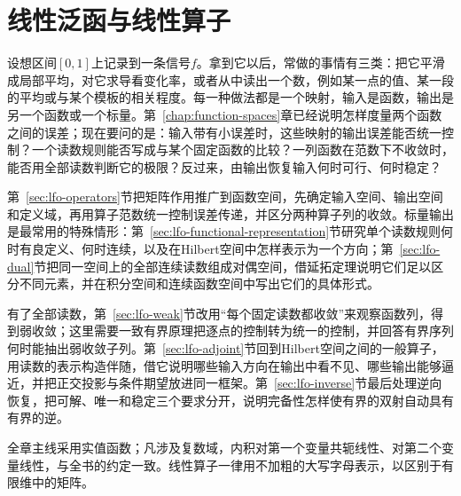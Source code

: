 \chapter{线性泛函与线性算子}
\label{chap:linear-functionals-operators}

设想区间$[0,1]$上记录到一条信号$f$。拿到它以后，常做的事情有三类：把它平滑成局部平均，对它求导看变化率，或者从中读出一个数，例如某一点的值、某一段的平均或与某个模板的相关程度。每一种做法都是一个映射，输入是函数，输出是另一个函数或一个标量。第~\ref{chap:function-spaces}章已经说明怎样度量两个函数之间的误差；现在要问的是：输入带有小误差时，这些映射的输出误差能否统一控制？一个读数规则能否写成与某个固定函数的比较？一列函数在范数下不收敛时，能否用全部读数判断它的极限？反过来，由输出恢复输入何时可行、何时稳定？

第~\ref{sec:lfo-operators}节把矩阵作用推广到函数空间，先确定输入空间、输出空间和定义域，再用算子范数统一控制误差传递，并区分两种算子列的收敛。标量输出是最常用的特殊情形：第~\ref{sec:lfo-functional-representation}节研究单个读数规则何时有良定义、何时连续，以及在Hilbert空间中怎样表示为一个方向；第~\ref{sec:lfo-dual}节把同一空间上的全部连续读数组成对偶空间，借延拓定理说明它们足以区分不同元素，并在积分空间和连续函数空间中写出它们的具体形式。

有了全部读数，第~\ref{sec:lfo-weak}节改用“每个固定读数都收敛”来观察函数列，得到弱收敛；这里需要一致有界原理把逐点的控制转为统一的控制，并回答有界序列何时能抽出弱收敛子列。第~\ref{sec:lfo-adjoint}节回到Hilbert空间之间的一般算子，用读数的表示构造伴随，借它说明哪些输入方向在输出中看不见、哪些输出能够逼近，并把正交投影与条件期望放进同一框架。第~\ref{sec:lfo-inverse}节最后处理逆向恢复，把可解、唯一和稳定三个要求分开，说明完备性怎样使有界的双射自动具有有界的逆。

全章主线采用实值函数；凡涉及复数域，内积对第一个变量共轭线性、对第二个变量线性，与全书的约定一致。线性算子一律用不加粗的大写字母表示，以区别于有限维中的矩阵。








